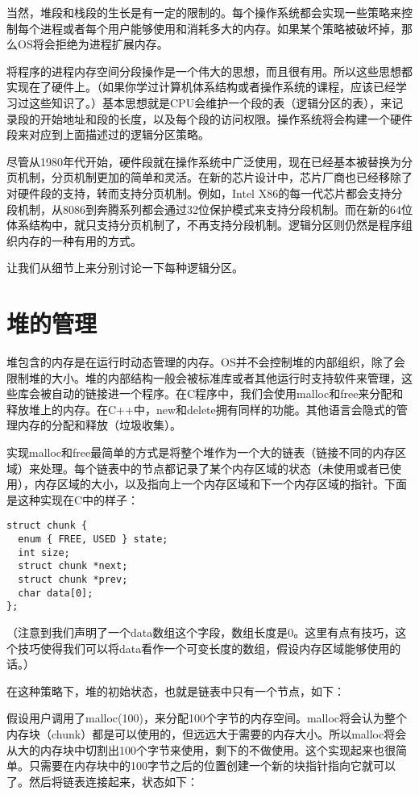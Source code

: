 \documentclass[cn,11pt,chinese]{elegantbook}
\begin{document}
当然，堆段和栈段的生长是有一定的限制的。每个操作系统都会实现一些策略来控制每个进程或者每个用户能够使用和消耗多大的内存。如果某个策略被破坏掉，那么OS将会拒绝为进程扩展内存。

将程序的进程内存空间分段操作是一个伟大的思想，而且很有用。所以这些思想都实现在了硬件上。（如果你学过计算机体系结构或者操作系统的课程，应该已经学习过这些知识了。）基本思想就是CPU会维护一个段的表（逻辑分区的表），来记录段的开始地址和段的长度，以及每个段的访问权限。操作系统将会构建一个硬件段来对应到上面描述过的逻辑分区策略。

尽管从1980年代开始，硬件段就在操作系统中广泛使用，现在已经基本被替换为分页机制，分页机制更加的简单和灵活。在新的芯片设计中，芯片厂商也已经移除了对硬件段的支持，转而支持分页机制。例如，Intel X86的每一代芯片都会支持分段机制，从8086到奔腾系列都会通过32位保护模式来支持分段机制。而在新的64位体系结构中，就只支持分页机制了，不再支持分段机制。逻辑分区则仍然是程序组织内存的一种有用的方式。

让我们从细节上来分别讨论一下每种逻辑分区。

\section{堆的管理}

堆包含的内存是在运行时动态管理的内存。OS并不会控制堆的内部组织，除了会限制堆的大小。堆的内部结构一般会被标准库或者其他运行时支持软件来管理，这些库会被自动的链接进一个程序。在C程序中，我们会使用malloc和free来分配和释放堆上的内存。在C++中，new和delete拥有同样的功能。其他语言会隐式的管理内存的分配和释放（垃圾收集）。

实现malloc和free最简单的方式是将整个堆作为一个大的链表（链接不同的内存区域）来处理。每个链表中的节点都记录了某个内存区域的状态（未使用或者已使用），内存区域的大小，以及指向上一个内存区域和下一个内存区域的指针。下面是这种实现在C中的样子：

\begin{verbatim}
struct chunk {
  enum { FREE, USED } state;
  int size;
  struct chunk *next;
  struct chunk *prev;
  char data[0];
};
\end{verbatim}

（注意到我们声明了一个data数组这个字段，数组长度是0。这里有点有技巧，这个技巧使得我们可以将data看作一个可变长度的数组，假设内存区域能够使用的话。）

在这种策略下，堆的初始状态，也就是链表中只有一个节点，如下：

假设用户调用了malloc(100)，来分配100个字节的内存空间。malloc将会认为整个内存块（chunk）都是可以使用的，但远远大于需要的内存大小。所以malloc将会从大的内存块中切割出100个字节来使用，剩下的不做使用。这个实现起来也很简单。只需要在内存块中的100字节之后的位置创建一个新的块指针指向它就可以了。然后将链表连接起来，状态如下：
\end{document}
